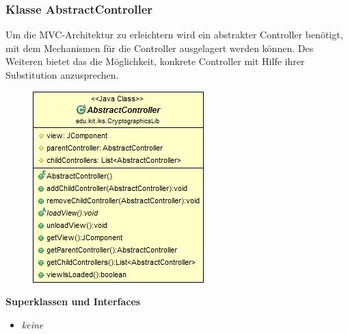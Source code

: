 \documentclass{article}
\begin{document}
  	\subsubsection{Klasse AbstractController}
	  Um die MVC-Architektur zu erleichtern wird ein abstrakter Controller benötigt, mit dem Mechanismen
	  für die Controller ausgelagert werden können. Des Weiteren bietet das die Möglichkeit, konkrete
	  Controller mit Hilfe ihrer Substitution anzusprechen.
	
      \begin{figure}[H]
        \centering
        \includegraphics{resources/edu-kit-iks-CryptographicsLib-AbstractController}
      \end{figure}
	
      \textbf{Superklassen und Interfaces}
      \begin{itemize}
        \item \textit{keine}
      \end{itemize}
	
\end{document}
